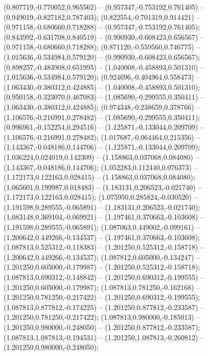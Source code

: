  (0.807719,-0.770052,0.965562) -- (0.957347,-0.753192,0.761405) -- (0.949019,-0.827182,0.787403);
 (0.822554,-0.701319,0.914421) -- (0.971158,-0.680660,0.718288) -- (0.957347,-0.753192,0.761405);
 (0.843992,-0.631708,0.840519) -- (0.990930,-0.608423,0.656567) -- (0.971158,-0.680660,0.718288);
 (0.871120,-0.559560,0.746775) -- (1.015636,-0.534984,0.579120) -- (0.990930,-0.608423,0.656567);
 (0.898257,-0.483908,0.651995) -- (1.040008,-0.458893,0.501310) -- (1.015636,-0.534984,0.579120);
 (0.924696,-0.404964,0.558473) -- (1.063430,-0.380312,0.424885) -- (1.040008,-0.458893,0.501310);
 (0.950158,-0.323070,0.467083) -- (1.085690,-0.299555,0.350411) -- (1.063430,-0.380312,0.424885);
 (0.974348,-0.238659,0.378766) -- (1.106576,-0.216991,0.278482) -- (1.085690,-0.299555,0.350411);
 (0.996961,-0.152254,0.294516) -- (1.125871,-0.133044,0.209709) -- (1.106576,-0.216991,0.278482);
 (1.017687,-0.064464,0.215356) -- (1.143367,-0.048186,0.144706) -- (1.125871,-0.133044,0.209709);
 (1.036224,0.024019,0.142309) -- (1.158863,0.037068,0.084080) -- (1.143367,-0.048186,0.144706);
 (1.052283,0.112440,0.076373) -- (1.172173,0.122163,0.028415) -- (1.158863,0.037068,0.084080);
 (1.065601,0.199987,0.018483) -- (1.183131,0.206523,-0.021740) -- (1.172173,0.122163,0.028415);
 (1.075950,0.285824,-0.030520) -- (1.191598,0.289555,-0.065891) -- (1.183131,0.206523,-0.021740);
 (1.083148,0.369104,-0.069921) -- (1.197461,0.370663,-0.103608) -- (1.191598,0.289555,-0.065891);
 (1.087063,0.449002,-0.099161) -- (1.200642,0.449266,-0.134537) -- (1.197461,0.370663,-0.103608);
 (1.087813,0.525312,-0.118383) -- (1.201250,0.525312,-0.158718) -- (1.200642,0.449266,-0.134537);
 (1.087812,0.605000,-0.134247) -- (1.201250,0.605000,-0.179987) -- (1.201250,0.525312,-0.158718);
 (1.087813,0.690312,-0.148842) -- (1.201250,0.690312,-0.199555) -- (1.201250,0.605000,-0.179987);
 (1.087813,0.781250,-0.162168) -- (1.201250,0.781250,-0.217422) -- (1.201250,0.690312,-0.199555);
 (1.087813,0.877812,-0.174225) -- (1.201250,0.877812,-0.233587) -- (1.201250,0.781250,-0.217422);
 (1.087813,0.980000,-0.185013) -- (1.201250,0.980000,-0.248050) -- (1.201250,0.877812,-0.233587);
 (1.087813,1.087813,-0.194531) -- (1.201250,1.087813,-0.260812) -- (1.201250,0.980000,-0.248050);
